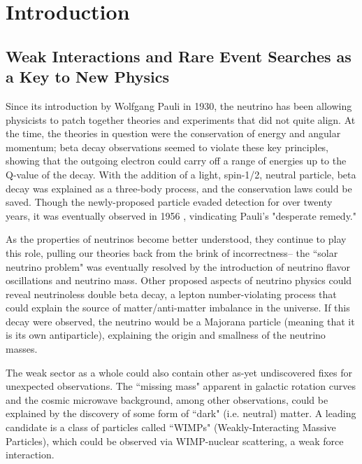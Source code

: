 %
%

\textpages
 
 
\chapter {Introduction}

\section{Weak Interactions and Rare Event Searches as a Key to New Physics}
Since its introduction by Wolfgang Pauli in 1930, the neutrino has been allowing physicists to patch together theories and experiments that did not quite align. At the time, the theories in question were the conservation of energy and angular momentum; beta decay observations seemed to violate these key principles, showing that the outgoing electron could carry off a range of energies up to the Q-value of the decay. With the addition of a light, spin-1/2, neutral particle, beta decay was explained as a three-body process, and the conservation laws could be saved. Though the newly-proposed particle evaded detection for over twenty years, it was eventually observed in 1956 \cite{Cowan1956}, vindicating Pauli's "desperate remedy." \cite{Pauli1930}

As the properties of neutrinos become better understood, they continue to play this role, pulling our theories back from the brink of incorrectness-- the ``solar neutrino problem" was eventually resolved by the introduction of neutrino flavor oscillations and neutrino mass. \cite{PDG2014} Other proposed aspects of neutrino physics could reveal neutrinoless double beta decay, a lepton number-violating process that could explain the source of matter/anti-matter imbalance in the universe. If this decay were observed, the neutrino would be a Majorana particle (meaning that it is its own antiparticle), explaining the origin and smallness of the neutrino masses.

The weak sector as a whole could also contain other as-yet undiscovered fixes for unexpected observations. The ``missing mass" apparent in galactic rotation curves and the cosmic microwave background, among other observations, could be explained by the discovery of some form of ``dark" (i.e. neutral) matter. A leading candidate is a class of particles called ``WIMPs" (Weakly-Interacting Massive Particles), which could be observed via WIMP-nuclear scattering, a weak force interaction. 

